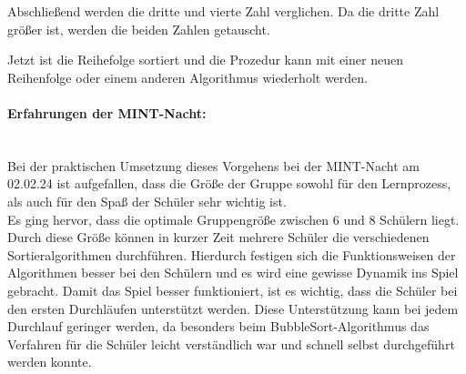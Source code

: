 \documentclass[./entry.tex]{subfiles}
\begin{document}
    Abschließend werden die dritte und vierte Zahl verglichen.
    Da die dritte Zahl größer ist, werden die beiden Zahlen getauscht.

    \vspace{0.5cm}


    Jetzt ist die Reihefolge sortiert und die Prozedur kann
    mit einer neuen Reihenfolge oder einem anderen Algorithmus wiederholt werden.
   \\
	\paragraph{Erfahrungen der MINT-Nacht:} \mbox{} \\
	Bei der praktischen Umsetzung dieses Vorgehens bei der MINT-Nacht am 02.02.24 ist aufgefallen, dass die Größe der Gruppe sowohl für den Lernprozess, als auch für den Spaß der Schüler sehr wichtig ist.
	\\
	Es ging hervor, dass die optimale Gruppengröße zwischen 6 und 8 Schülern liegt.
	Durch diese Größe können in kurzer Zeit mehrere Schüler die verschiedenen Sortieralgorithmen durchführen.
	Hierdurch festigen sich die Funktionsweisen der Algorithmen besser bei den Schülern und es wird eine gewisse Dynamik ins Spiel gebracht.
	Damit das Spiel besser funktioniert, ist es wichtig, dass die Schüler bei den ersten Durchläufen unterstützt werden.
	Diese Unterstützung kann bei jedem Durchlauf geringer werden, da besonders beim BubbleSort-Algorithmus das Verfahren für die Schüler leicht verständlich war und schnell selbst durchgeführt werden konnte.
	
\end{document}
